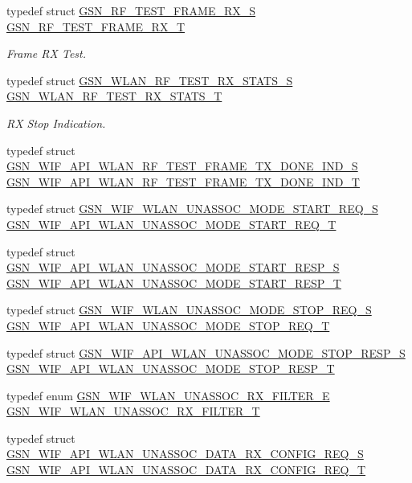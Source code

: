 \begin{DoxyCompactItemize}
typedef struct \hyperlink{a00186}{GSN\_\-RF\_\-TEST\_\-FRAME\_\-RX\_\-S} \hyperlink{a00677_gad57c6b5251e62dd07e194a52c90216ac}{GSN\_\-RF\_\-TEST\_\-FRAME\_\-RX\_\-T}
\begin{DoxyCompactList}\small\item\em Frame RX Test. \end{DoxyCompactList}\item 
typedef struct \hyperlink{a00419}{GSN\_\-WLAN\_\-RF\_\-TEST\_\-RX\_\-STATS\_\-S} \hyperlink{a00677_ga150fdf6ec3c7c370b27651412b36653a}{GSN\_\-WLAN\_\-RF\_\-TEST\_\-RX\_\-STATS\_\-T}
\begin{DoxyCompactList}\small\item\em RX Stop Indication. \end{DoxyCompactList}\item 
typedef struct \hyperlink{a00305}{GSN\_\-WIF\_\-API\_\-WLAN\_\-RF\_\-TEST\_\-FRAME\_\-TX\_\-DONE\_\-IND\_\-S} \hyperlink{a00677_gab973e6ccfee43f5c404b5e6cea8d6e73}{GSN\_\-WIF\_\-API\_\-WLAN\_\-RF\_\-TEST\_\-FRAME\_\-TX\_\-DONE\_\-IND\_\-T}
\item 
typedef struct \hyperlink{a00412}{GSN\_\-WIF\_\-WLAN\_\-UNASSOC\_\-MODE\_\-START\_\-REQ\_\-S} \hyperlink{a00677_ga848e3ca7a503435832991132fed9c32a}{GSN\_\-WIF\_\-API\_\-WLAN\_\-UNASSOC\_\-MODE\_\-START\_\-REQ\_\-T}
\item 
typedef struct \hyperlink{a00316}{GSN\_\-WIF\_\-API\_\-WLAN\_\-UNASSOC\_\-MODE\_\-START\_\-RESP\_\-S} \hyperlink{a00677_gaa302516a0b32337d991a88c35c71c5cf}{GSN\_\-WIF\_\-API\_\-WLAN\_\-UNASSOC\_\-MODE\_\-START\_\-RESP\_\-T}
\item 
typedef struct \hyperlink{a00413}{GSN\_\-WIF\_\-WLAN\_\-UNASSOC\_\-MODE\_\-STOP\_\-REQ\_\-S} \hyperlink{a00677_ga46d9bd5f7cc8d81cf0ada9306373c3ee}{GSN\_\-WIF\_\-API\_\-WLAN\_\-UNASSOC\_\-MODE\_\-STOP\_\-REQ\_\-T}
\item 
typedef struct \hyperlink{a00317}{GSN\_\-WIF\_\-API\_\-WLAN\_\-UNASSOC\_\-MODE\_\-STOP\_\-RESP\_\-S} \hyperlink{a00677_ga2b01fa07922ed26ce73e38810a71c9ed}{GSN\_\-WIF\_\-API\_\-WLAN\_\-UNASSOC\_\-MODE\_\-STOP\_\-RESP\_\-T}
\item 
typedef enum \hyperlink{a00677_gaca8dae165f1024726492234d64d1bb26}{GSN\_\-WIF\_\-WLAN\_\-UNASSOC\_\-RX\_\-FILTER\_\-E} \hyperlink{a00677_gafef4e43da9e6e7525cd681c38eb10fed}{GSN\_\-WIF\_\-WLAN\_\-UNASSOC\_\-RX\_\-FILTER\_\-T}
\item 
typedef struct \hyperlink{a00306}{GSN\_\-WIF\_\-API\_\-WLAN\_\-UNASSOC\_\-DATA\_\-RX\_\-CONFIG\_\-REQ\_\-S} \hyperlink{a00677_ga9f4de24aab16f8c36b6afc23f8b6a1d4}{GSN\_\-WIF\_\-API\_\-WLAN\_\-UNASSOC\_\-DATA\_\-RX\_\-CONFIG\_\-REQ\_\-T}

\end{DoxyCompactItemize}
